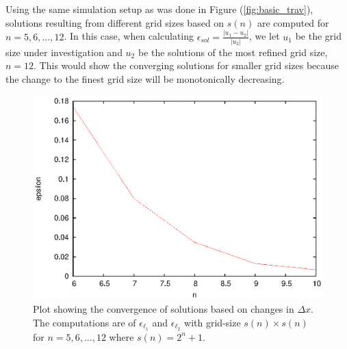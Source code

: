  Using the same simulation setup as was done in Figure (\ref{fig:basic_trav}), solutions resulting from different grid sizes based on $s(n)$ are computed for $n = 5, 6, \ldots, 12$.
 In this case, when calculating $\epsilon_{sol} = \frac{| u_1 - u_2 |}{|u_2|}$, we let $u_1$ be the grid size under investigation and $u_2$ be the solutions of the most refined grid size, $n = 12$.
 This would show the converging solutions for smaller grid sizes because the change to the finest grid size will be monotonically decreasing.

 \begin{figure}
   \centering
   \includegraphics{converge_spatial}
   \caption{Plot showing the convergence of solutions based on changes in $\Delta x$. The computations are of $\epsilon_{\ell_1}$ and $\epsilon_{\ell_2}$ with grid-size $s(n) \times s(n)$ for $n = 5,6,\ldots,12$ where $s(n) = 2^{n}+1$.}
   \label{fig:converge_spatial}
 \end{figure}

